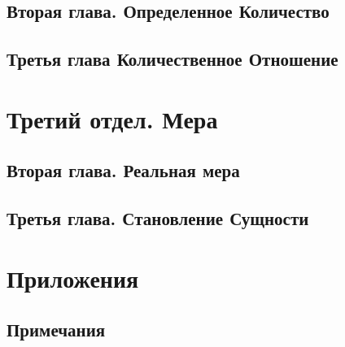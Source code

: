\documentclass[b5paper, 11pt, twoside, onecolumn, openany]{memoir}
\begin{document}
\chapter[{\em Вторая глава} Определенное Количество]{Вторая глава. Определенное Количество}


\chapter[Третья глава Количественное Отношение]{Третья глава Количественное Отношение}



\part[{\em Третий отдел} МEРА]{Третий отдел. Мера}


\chapter[{\em Вторая глава} Реальная мера]{Вторая глава. Реальная мера}


\chapter[{\em Третья глава} Становление Сущности]{Третья глава. Становление Сущности}


\backmatter

\part[ПРИЛОЖЕНИЯ]{Приложения}


\newpage

\chapter[ПРИМЕЧАНИЯ]{Примечания}



\clearpage
\tableofcontents*
\clearpage
\end{document}
